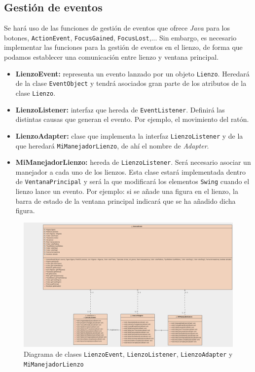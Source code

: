 \subsection{Gestión de eventos}
Se hará uso de las funciones de gestión de eventos que ofrece \textit{Java} para los botones, \texttt{ActionEvent}, \texttt{FocusGained}, \texttt{FocusLost},... Sin embargo, es necesario implementar las funciones para la gestión de eventos en el lienzo, de forma que podamos establecer una comunicación entre lienzo y ventana principal.
\begin{itemize}
\item{\textbf{LienzoEvent:} representa un evento lanzado por un objeto \texttt{Lienzo}. Heredará de la clase \texttt{EventObject} y tendrá asociados gran parte de los atributos de la clase \texttt{Lienzo}.}
\item{\textbf{LienzoListener:} interfaz que hereda de \texttt{EventListener}. Definirá las distintas causas que generan el evento. Por ejemplo, el movimiento del ratón.}
\item{\textbf{LienzoAdapter:} clase que implementa la interfaz \texttt{LienzoListener} y de la que heredará \texttt{MiManejadorLienzo}, de ahí el nombre de \textit{Adapter}.}
\item{\textbf{MiManejadorLienzo:} hereda de \texttt{LienzoListener}. Será necesario asociar un manejador a cada uno de los lienzos. Esta clase estará implementada dentro de \texttt{VentanaPrincipal} y será la que modificará los elementos \texttt{Swing} cuando el lienzo lance un evento. Por ejemplo: si se añade una figura en el lienzo, la barra de estado de la ventana principal indicará que se ha añadido dicha figura.}
\end{itemize}

\vskip0.3cm
\begin{figure}
 \centering
  \includegraphics[width=1.1\textwidth]{diagramas/LienzoEvent.png}
 \caption{Diagrama de clases \texttt{LienzoEvent}, \texttt{LienzoListener}, \texttt{LienzoAdapter} y \texttt{MiManejadorLienzo}}
 \label{diseño}
 \end{figure}

